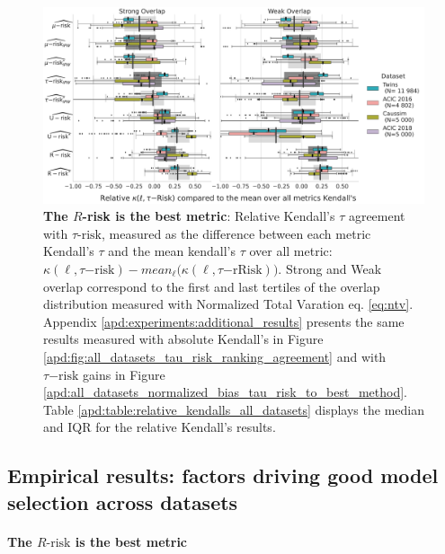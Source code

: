 \documentclass[10pt]{article}
\begin{document}
\begin{multicols}{2}
    \begin{figure}[!b]
        \centering
        \includegraphics[width=\textwidth]{images/_1_r_risk_domination_r_risk_domination__ref_metric_mean_risks_by_Dataset.pdf}
        \hfill
        \caption{\textbf{The $R$-risk is the best metric}: Relative Kendall's $\tau$ agreement with $\tau\text{-risk}$, measured
            as the difference between each metric Kendall's $\tau$ and the mean kendall's
            $\tau$ over all metric:  $\kappa(\ell,\tau\mathrm{{-risk}}) - mean_{\ell} \big(\kappa(\ell,\tau\mathrm{{-rRisk}}) \big)$. Strong and Weak overlap correspond
            to the first and
            last tertiles of the overlap distribution measured with Normalized Total
            Varation eq. \ref{eq:ntv}.
            Appendix \ref{apd:experiments:additional_results} presents the same results
            measured with absolute Kendall's in Figure
            \ref{apd:fig:all_datasets_tau_risk_ranking_agreement} and with
            $\tau\mathrm{-risk}$ gains in Figure \ref{apd:all_datasets_normalized_bias_tau_risk_to_best_method}. Table \ref{apd:table:relative_kendalls_all_datasets} displays the median
            and IQR for the relative Kendall's results.}\label{fig:relative_kendalls_all_datasets}
    \end{figure}

    \subsection{Empirical results: factors driving good model selection across
        datasets}\label{empirical_study:results}


    \paragraph{The $R\text{-risk}$ is the best metric}


\end{multicols}
\end{document}
